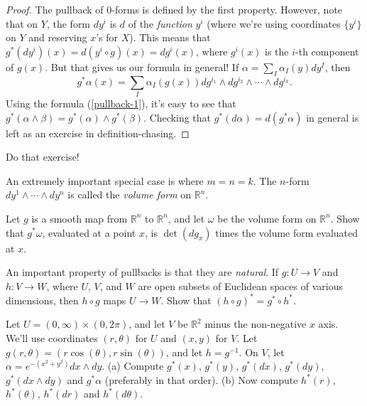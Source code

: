 \documentclass[12pt]{amsbook}
\newcommand{\be}{\begin{equation}}
\newcommand{\ee}{\end{equation}}
\newcommand{\R}{{\mathbb R}}
\theoremstyle{definition}
\begin{document}
\begin{proof}
The pullback of 
$0$-forms is defined by the first property. However, note that on 
$Y$, the form $dy^i$ is $d$ of the {\em function} $y^i$ (where we're using 
coordinates $\{y^i\}$ on $Y$ and reserving $x$'s for $X$). This means that 
$g^*(dy^i)(x) = d(y^i\circ g)(x) = dg^i(x)$, where $g^i(x)$ is the $i$-th 
component of $g(x)$. But that gives us our formula in general! If $\alpha =
\sum_I \alpha_I(y) dy^I$, then
\be\label{pullback-1} 
g^* \alpha(x) = \sum_I \alpha_I(g(x)) dg^{i_1}\wedge dg^{i_2} \wedge
\cdots \wedge dg^{i_k}.
\ee
Using the formula (\ref{pullback-1}), it's easy to see that 
$g^*(\alpha \wedge \beta) = g^*(\alpha) \wedge g^*(\beta)$.
Checking that $g^*(d\alpha) = d(g^* \alpha)$ in general is left as an
exercise in definition-chasing.
\end{proof}

\smallskip
{} Do that exercise!    
\smallskip
         
An extremely important special case is where $m=n=k$. The $n$-form $dy^1 \wedge \cdots \wedge dy^n$ is called 
the {\em volume form} on $\R^n$. 

\smallskip

 Let $g$ is a smooth map from $\R^n$ to
$\R^n$, and let $\omega$ be the volume form on $\R^n$. Show that $g^*
\omega$, evaluated at a point $x$, is $\det(dg_x)$ times the volume
form evaluated at $x$.

\smallskip

 An important property of pullbacks is that
they are {\em natural}. If $g: U \to V$ and $h: V \to W$, where $U$,
$V$, and $W$ are open subsets of Euclidean spaces of various
dimensions, then $h \circ g$ maps $U \to W$. Show that $(h \circ g)^*
= g^* \circ h^*$.

\smallskip

 Let $U = (0,\infty) \times (0, 2\pi)$, and let $V$
be $\R^2$ minus the non-negative $x$ axis. We'll use coordinates $(r,\theta)$
for $U$ and $(x,y)$ for $V$. Let 
$g(r,\theta)= (r \cos(\theta), r \sin(\theta))$, and let $h = g^{-1}$. 
On $V$, let $\alpha = e^{-(x^2+y^2)} dx \wedge dy$. \newline
(a) Compute $g^*(x)$, $g^*(y)$, $g^*(dx)$, $g^*(dy)$, $g^*(dx \wedge dy)$ and 
$g^*\alpha$ (preferably in that order). \newline
(b) Now compute $h^*(r)$, $h^*(\theta)$, $h^*(dr)$ and $h^*(d\theta)$. 
\end{document}
